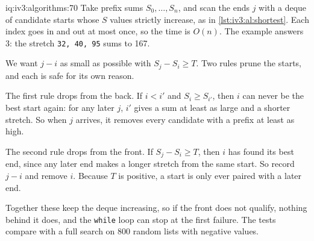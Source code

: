 \begin{solution}{iq:iv3:algorithms:70}
Take prefix sums $S_0, \dots, S_n$, and scan the ends $j$ with a deque of candidate starts whose $S$ values strictly increase, as in \cref{lst:iv3:al:shortest}. Each index goes in and out at most once, so the time is $O(n)$. The example answers 3: the stretch \texttt{32, 40, 95} sums to 167.
\label{lst:iv3:al:shortest}

We want $j - i$ as small as possible with $S_j - S_i \ge T$. Two rules prune the starts, and each is safe for its own reason.

The first rule drops from the back. If $i < i'$ and $S_i \ge S_{i'}$, then $i$ can never be the best start again: for any later $j$, $i'$ gives a sum at least as large and a shorter stretch. So when $j$ arrives, it removes every candidate with a prefix at least as high.

The second rule drops from the front. If $S_j - S_i \ge T$, then $i$ has found its best end, since any later end makes a longer stretch from the same start. So record $j - i$ and remove $i$. Because $T$ is positive, a start is only ever paired with a later end.

Together these keep the deque increasing, so if the front does not qualify, nothing behind it does, and the \texttt{while} loop can stop at the first failure. The tests compare with a full search on 800 random lists with negative values.

\end{solution}

